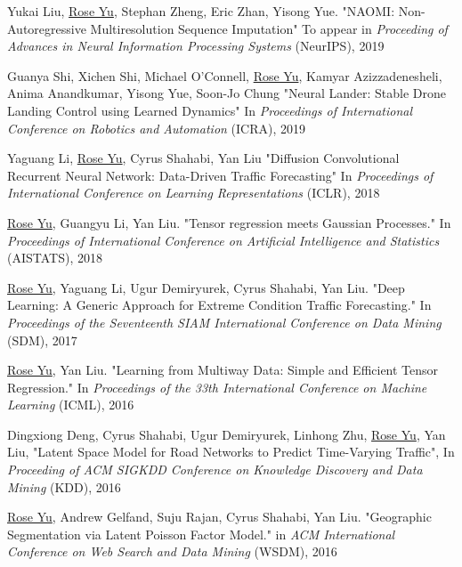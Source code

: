 \documentclass[margin,line]{res}
\begin{document}
\begin{resume}
\begin{enumerate}[label={[C\arabic*]}]
 
\item  Yukai Liu, \underline{Rose Yu}, Stephan Zheng, Eric Zhan, Yisong Yue. "NAOMI: Non-Autoregressive Multiresolution Sequence Imputation" To appear in \textit{Proceeding of Advances in Neural Information Processing Systems} (NeurIPS), 2019


\item Guanya Shi, Xichen Shi, Michael O'Connell, \underline{Rose Yu}, Kamyar Azizzadenesheli, Anima Anandkumar, Yisong Yue, Soon-Jo Chung
       "Neural Lander: Stable Drone Landing Control using Learned Dynamics" In \textit{Proceedings  of International Conference on Robotics and Automation} (ICRA), 2019

\item 	Yaguang Li,  \underline{Rose Yu}, Cyrus Shahabi, Yan Liu
	"Diffusion Convolutional Recurrent Neural Network: Data-Driven Traffic Forecasting" In \textit{Proceedings  of  International Conference on Learning Representations
	}(ICLR), 2018 
	
\item  \underline{Rose Yu}, Guangyu Li, Yan Liu. "Tensor regression meets Gaussian Processes." In \textit{Proceedings  of  International Conference on Artificial Intelligence and Statistics } (AISTATS), 2018 

\item \underline{Rose Yu}, Yaguang Li, Ugur Demiryurek, Cyrus Shahabi, Yan Liu. "Deep Learning: A Generic Approach for Extreme Condition Traffic Forecasting." In \textit{Proceedings  of the Seventeenth SIAM International Conference on Data Mining }(SDM), 2017

\item \underline{Rose Yu}, Yan Liu. "Learning from Multiway Data: Simple and Efficient Tensor Regression." In \textit{Proceedings  of the 33th International Conference on Machine Learning }(ICML),   2016

\item Dingxiong Deng, Cyrus Shahabi, Ugur Demiryurek, Linhong Zhu,  \underline{Rose Yu}, Yan Liu, 
"Latent Space Model for Road Networks to Predict Time-Varying Traffic", In \textit{Proceeding of ACM SIGKDD Conference on Knowledge Discovery and Data Mining } (KDD), 2016


\item \underline{Rose Yu}, Andrew Gelfand, Suju Rajan, Cyrus Shahabi, Yan Liu. "Geographic Segmentation via Latent Poisson Factor Model." in \textit{ACM International Conference on Web Search and Data Mining} (WSDM), 2016 


\end{enumerate}
\end{resume}
\end{document}
